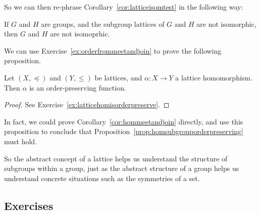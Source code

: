 So we can then re-phrase Corollary~\ref{cor:latticeisomtest} in the 
following way:

\begin{corollary}
  If $G$ and $H$ are groups, and the subgroup lattices of $G$ and $H$
  are not isomorphic, then $G$ and $H$ are not isomoprhic.
\end{corollary}

We can use Exercise~\ref{ex:orderfrommeetandjoin} to prove the 
following proposition.

\begin{proposition}\label{prop:latticehomisorderpreserve}
  Let $(X, \preceq)$ and $(Y, \le)$ be lattices, and $\alpha : X \to 
  Y$ a lattice homomorphism.  Then $\alpha$ is an order-preserving 
  function.
\end{proposition}
\begin{proof}
  See Exercise~\ref{ex:latticehomisorderpreserve}.
\end{proof}

In fact, we could prove Corollary~\ref{cor:hommeetandjoin} directly, 
and use this proposition to conclude that 
Proposition~\ref{prop:homsubgrouporderpreserving} must hold.

So the abstract concept of a lattice helps us understand the structure 
of subgroups within a group, just as the abstract structure of a group 
helps us understand concrete situations such as the symmetries of a 
set.

\subsection*{Exercises}

